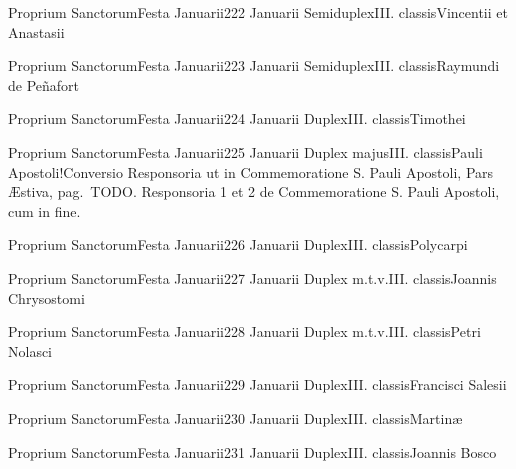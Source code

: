 \documentclass[liber-responsorialis_sanctorale.tex]{subfiles}
\begin{document}
	{Proprium Sanctorum}{Festa Januarii}{2}{22 Januarii}
	{Semiduplex}{III. classis}{Vincentii et Anastasii}
	{\pmexrubric}
	{\respdetemp}

	{Proprium Sanctorum}{Festa Januarii}{2}{23 Januarii}
	{Semiduplex}{III. classis}{Raymundi de Peñafort}
	{\conprubric}
	{\respdetemp}

	{Proprium Sanctorum}{Festa Januarii}{2}{24 Januarii}
	{Duplex}{III. classis}{Timothei}
	{\umexrubric}
	{\respdetemp}

	{Proprium Sanctorum}{Festa Januarii}{2}{25 Januarii}
	{Duplex majus}{III. classis}{Pauli Apostoli!Conversio}
	{Responsoria ut in Commemoratione S. Pauli Apostoli, Pars Æstiva, pag.\ TODO.}
	{Responsoria 1 et 2 de Commemoratione S. Pauli Apostoli, cum  in fine.}

	{Proprium Sanctorum}{Festa Januarii}{2}{26 Januarii}
	{Duplex}{III. classis}{Polycarpi}
	{\umexrubric}
	{\respdetemp}

	{Proprium Sanctorum}{Festa Januarii}{2}{27 Januarii}
	{Duplex m.t.v.}{III. classis}{Joannis Chrysostomi}
	{\copodorubric}
	{\respdetemp}

	{Proprium Sanctorum}{Festa Januarii}{2}{28 Januarii}
	{Duplex m.t.v.}{III. classis}{Petri Nolasci}
	{\conprubric}
	{\respdetemp}

	{Proprium Sanctorum}{Festa Januarii}{2}{29 Januarii}
	{Duplex}{III. classis}{Francisci Salesii}
	{\copodorubric}
	{\respdetemp}

	{Proprium Sanctorum}{Festa Januarii}{2}{30 Januarii}
	{Duplex}{III. classis}{Martinæ}
	{\vmrubric}
	{\respdetemp}

	{Proprium Sanctorum}{Festa Januarii}{2}{31 Januarii}
	{Duplex}{III. classis}{Joannis Bosco}
	{\conprubric}
	{\respdetemp}
\end{document}

